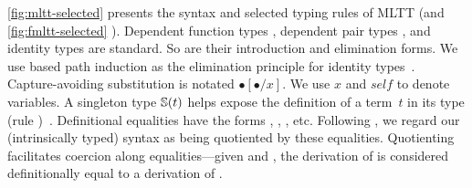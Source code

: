 

\cref{fig:mltt-selected} presents the syntax and selected typing rules of MLTT %
(and \cref{fig:fmltt-selected} \TT).
Dependent function types ,
dependent pair types , and
identity types  are standard.
So are their introduction and elimination forms.
We use based path induction
as the elimination principle for identity types~.
Capture-avoiding substitution is notated $\bullet[\bullet/x]$.
We use $x$ and $\mathit{self}$ to denote variables.
A singleton type $\mathbb{S}({t})$ helps expose the definition of a term~$t$
in its type (rule )~\cite{aspinall1995singleton,stone2000}.
Definitional equalities have the forms %
,
,
,
etc.
Following \citet{altkap2016}, we regard our (intrinsically typed) syntax
as being quotiented by these equalities.
Quotienting facilitates coercion along equalities---given
 and
,
the derivation of  is considered definitionally equal to
a derivation of . %
